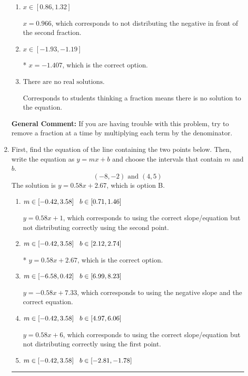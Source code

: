 \documentclass{extbook}[14pt]
\newcommand{\litem}[1]{\item #1

\rule{\textwidth}{0.4pt}}
\begin{document}
\begin{enumerate}
{\begin{enumerate}[label=\Alph*.]
 $x = -0.395$, which corresponds to dividing the second number in the numerator by the denominator rather than dividing BOTH parts of the numerator by the denominator (or removing the fractions through multiplication).
\item \( x \in [0.86, 1.32] \)

 $x = 0.966$, which corresponds to not distributing the negative in front of the second fraction.
\item \( x \in [-1.93, -1.19] \)

* $x = -1.407$, which is the correct option.
\item \( \text{There are no real solutions.} \)

Corresponds to students thinking a fraction means there is no solution to the equation.
\end{enumerate}

\textbf{General Comment:} If you are having trouble with this problem, try to remove a fraction at a time by multiplying each term by the denominator.
}
\litem{
First, find the equation of the line containing the two points below. Then, write the equation as $ y=mx+b $ and choose the intervals that contain $m$ and $b$.
\[ (-8, -2) \text{ and } (4, 5) \]The solution is \( y = 0.58x + 2.67 \), which is option B.\begin{enumerate}[label=\Alph*.]
\item \( m \in [-0.42, 3.58] \hspace*{3mm} b \in [0.71, 1.46] \)

 $y = 0.58x + 1$, which corresponds to using the correct slope/equation but not distributing correctly using the second point.
\item \( m \in [-0.42, 3.58] \hspace*{3mm} b \in [2.12, 2.74] \)

* $y = 0.58x + 2.67$, which is the correct option.
\item \( m \in [-6.58, 0.42] \hspace*{3mm} b \in [6.99, 8.23] \)

 $y = -0.58x + 7.33$, which corresponds to using the negative slope and the correct equation.
\item \( m \in [-0.42, 3.58] \hspace*{3mm} b \in [4.97, 6.06] \)

 $y = 0.58x + 6$, which corresponds to using the correct slope/equation but not distributing correctly using the first point.
\item \( m \in [-0.42, 3.58] \hspace*{3mm} b \in [-2.81, -1.78] \)


\end{enumerate}}
\end{enumerate}
\end{document}
